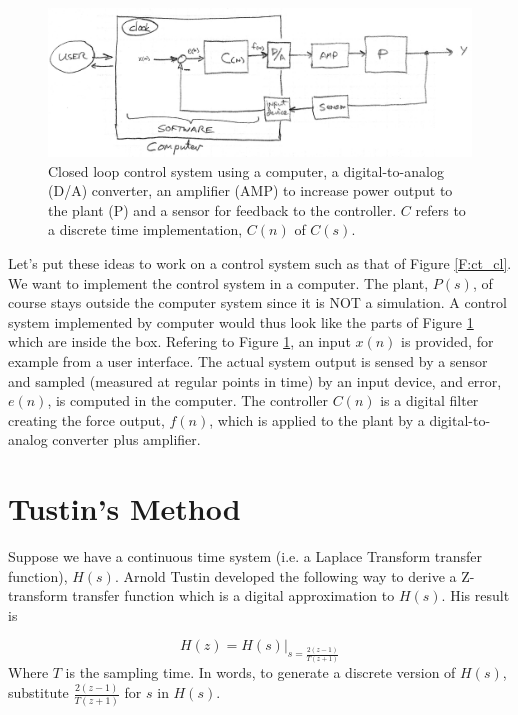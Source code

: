 \begin{figure}\centering
\includegraphics[width=6.00in]{figs11/01106.png}
\caption{Closed loop   control system using a computer, a digital-to-analog (D/A) converter, an amplifier (AMP) to increase power output to the plant (P) and a sensor for feedback to the controller.  $C$ refers to a discrete time implementation, $C(n)$ of $C(s)$.}\label{F:dt_cl}
\end{figure}



Let's put these ideas to work on  a control system such as that of Figure \ref{F:ct_cl}. 
We want to implement the control system in a computer.  
The plant, $P(s)$, of course stays outside the computer system since it is NOT a simulation.  
A control system implemented by computer would thus look like the parts of Figure \ref{F:dt_cl} which are inside the box. 
Refering to  Figure \ref{F:dt_cl}, an input $x(n)$  is provided, for example from a user interface.  The actual system output is sensed by a sensor  and sampled (measured at regular points in time) by an input device, and error, $e(n)$, is computed in the computer.  The controller $C(n)$ is a digital filter creating the force output, $f(n)$, which is applied to the plant by a digital-to-analog converter plus amplifier.


\section{Tustin's Method}

Suppose we have a continuous time system (i.e. a Laplace Transform transfer function), $H(s)$.   Arnold Tustin developed
the following way to derive a Z-transform transfer function which is a digital approximation to $H(s)$.   His result is

\[
H(z) = H(s)|_{s=\frac{2(z-1)}{T(z+1)}}
\]
Where $T$ is the sampling time.
In words,  to generate a discrete version of $H(s)$,  substitute ${\frac{2(z-1)}{T(z+1)}}$ for $s$ in $H(s)$.


